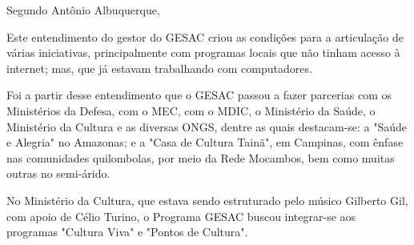 Segundo Antônio Albuquerque,


\noindent\begin{center}\mbox{\centering{}}\end{center}


Este entendimento do gestor do GESAC criou as condições para a articulação de várias iniciativas, principalmente com programas locais que não tinham acesso à internet; mas, que já estavam trabalhando com computadores.

Foi a partir desse entendimento que o GESAC passou a fazer parcerias com os Ministérios da Defesa, com o MEC, com o MDIC, o Ministério da Saúde, o Ministério da Cultura e as diversas ONGS, dentre as quais destacam-se: a "Saúde e Alegria" no Amazonas; e a "Casa de Cultura Tainã", em Campinas, com ênfase nas comunidades quilombolas, por meio da Rede Mocambos, bem como muitas outras no semi-árido.


\noindent\begin{center}\mbox{\centering{}}\end{center}


No Ministério da Cultura, que estava sendo estruturado pelo músico Gilberto Gil, com apoio de Célio Turino, o Programa GESAC buscou integrar-se aos programas "Cultura Viva" e "Pontos de Cultura".


